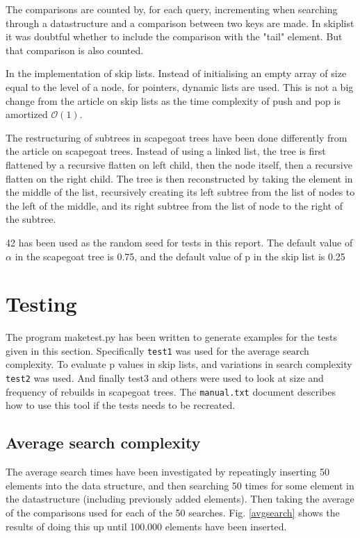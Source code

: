 \documentclass[12pt, a4paper]{article}
\begin{document}
\medskip

The comparisons are counted by, for each query, incrementing when searching through a datastructure and 
a comparison between two keys are made. In skiplist it was doubtful whether to include the comparison with the "tail" element. 
But that comparison is also counted.

\medskip

In the implementation of skip lists. Instead of initialising an empty array of size equal to the level of a node, 
for pointers, dynamic lists are used. 
This is not a big change from the article on skip lists as the time complexity of push and pop is amortized $\mathcal{O}(1)$.

\medskip

The restructuring of subtrees in scapegoat trees have been done differently from the article on scapegoat trees. 
Instead of using a linked list, the tree is first flattened by a recursive flatten on left child, then the node itself, then a recursive flatten
on the right child. The tree is then reconstructed by taking the element in the middle of the list, recursively creating its left subtree from the list
of nodes to the left of the middle, and its right subtree from the list of node to the right of the subtree.

\medskip

42 has been used as the random seed for tests in this report.
The default value of $\alpha$ in the scapegoat tree is 0.75, and the default value of p in the skip list is 0.25

\section*{Testing}
The program maketest.py has been written to generate examples for the tests given in this section. 
Specifically \texttt{test1} was used for the average search complexity.
To evaluate p values in skip lists, and variations in search complexity \texttt{test2} was used. 
And finally test3 and others were used to look at size and frequency of rebuilds in scapegoat trees.
The \texttt{manual.txt} document describes how to use this tool if the tests needs to be recreated.

\subsection*{Average search complexity}
The average search times have been investigated by repeatingly inserting 50 elements into the data structure, and then searching 50 times for some 
element in the datastructure (including previously added elements). Then taking the average of the comparisons used for each of the 50 searches.
Fig. \ref{avgsearch} shows the results of doing this up until 100.000 elements have been inserted.
\end{document}
